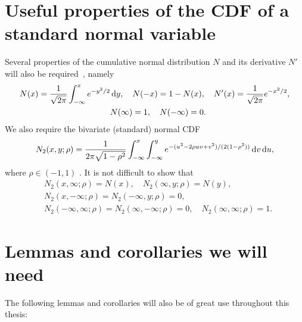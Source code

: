 \section{Useful properties of the CDF of a standard normal variable}
Several properties of the cumulative normal distribution $N$ and its derivative $N'$ will also be required~\cite[pp. 235--239]{Jeff1995}, namely
	\begin{equation}
		\begin{split}
		N(x) = \fr{1}{\sqrt{2\pi}}\int_{-\infty}^x e^{-y^2/2} & \, \d y, \quad %
		N(-x) = 1 - N(x), \quad
		N'(x) = \fr{1}{\sqrt{2\pi}}e^{-x^2/2} \label{eqn:Nprime}, \\
		&N(\infty) = 1, \quad N(-\infty) = 0.
		\end{split}
	\end{equation}
We also require the bivariate (standard) normal CDF~\cite{Genz2004}
	\begin{equation}
		\label{eqn:N2}
		N_2(x,y;\rho) = \frac{1}{2\pi\sqrt{1-\rho^2}}\int_{-\infty}^x\int_{-\infty}^y e^{-(u^2-2\rho uv + v^2)/(2(1-\rho^2))} \, \mathrm d v \, \mathrm d u,
	\end{equation}
where $\rho \in (-1,1)$ . It is not difficult to show that	
	\begin{equation}
		\label{eqn:Nspecial}
		\begin{split}
		&N_2(x,\infty;\rho) = N(x), \quad N_2(\infty,y;\rho) = N(y),\\
		&N_2(x,-\infty;\rho) = N_2(-\infty,y;\rho) = 0, \\
		&N_2(-\infty,\infty;\rho) = N_2(\infty,-\infty;\rho) = 0, \quad N_2(\infty,\infty;\rho) = 1.
		\end{split}
	\end{equation}
\section{Lemmas and corollaries we will need}
The following lemmas and corollaries will also be of great use throughout this thesis:
